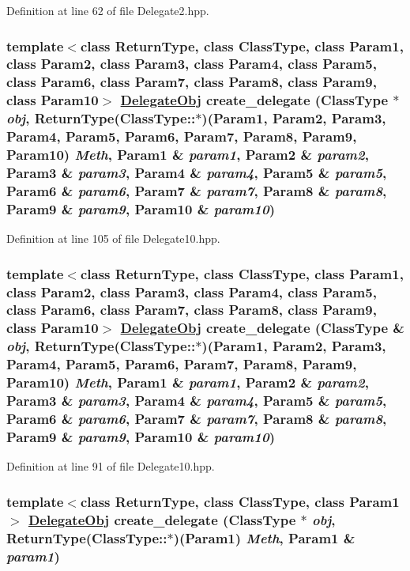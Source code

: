 Definition at line 62 of file Delegate2.hpp.\hypertarget{namespaceDL_a6}{
\subsubsection[create\_\-delegate]{\setlength{\rightskip}{0pt plus 5cm}template$<$class Return\-Type, class Class\-Type, class Param1, class Param2, class Param3, class Param4, class Param5, class Param6, class Param7, class Param8, class Param9, class Param10$>$ \hyperlink{namespaceDL_a0}{Delegate\-Obj} create\_\-delegate (Class\-Type $\ast$ {\em obj}, Return\-Type(Class\-Type::$\ast$)(Param1, Param2, Param3, Param4, Param5, Param6, Param7, Param8, Param9, Param10) {\em Meth}, Param1 \& {\em param1}, Param2 \& {\em param2}, Param3 \& {\em param3}, Param4 \& {\em param4}, Param5 \& {\em param5}, Param6 \& {\em param6}, Param7 \& {\em param7}, Param8 \& {\em param8}, Param9 \& {\em param9}, Param10 \& {\em param10})}}
\label{namespaceDL_a6}




Definition at line 105 of file Delegate10.hpp.\hypertarget{namespaceDL_a5}{
\subsubsection[create\_\-delegate]{\setlength{\rightskip}{0pt plus 5cm}template$<$class Return\-Type, class Class\-Type, class Param1, class Param2, class Param3, class Param4, class Param5, class Param6, class Param7, class Param8, class Param9, class Param10$>$ \hyperlink{namespaceDL_a0}{Delegate\-Obj} create\_\-delegate (Class\-Type \& {\em obj}, Return\-Type(Class\-Type::$\ast$)(Param1, Param2, Param3, Param4, Param5, Param6, Param7, Param8, Param9, Param10) {\em Meth}, Param1 \& {\em param1}, Param2 \& {\em param2}, Param3 \& {\em param3}, Param4 \& {\em param4}, Param5 \& {\em param5}, Param6 \& {\em param6}, Param7 \& {\em param7}, Param8 \& {\em param8}, Param9 \& {\em param9}, Param10 \& {\em param10})}}
\label{namespaceDL_a5}




Definition at line 91 of file Delegate10.hpp.\hypertarget{namespaceDL_a4}{
\subsubsection[create\_\-delegate]{\setlength{\rightskip}{0pt plus 5cm}template$<$class Return\-Type, class Class\-Type, class Param1$>$ \hyperlink{namespaceDL_a0}{Delegate\-Obj} create\_\-delegate (Class\-Type $\ast$ {\em obj}, Return\-Type(Class\-Type::$\ast$)(Param1) {\em Meth}, Param1 \& {\em param1})}}
\label{namespaceDL_a4}




